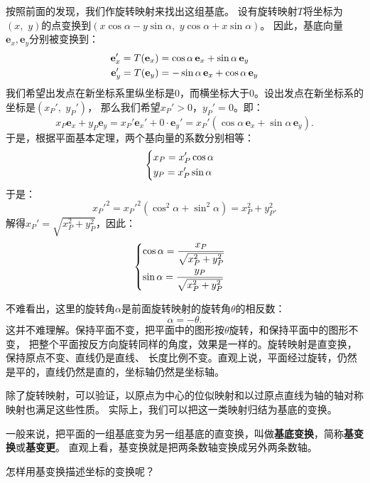 \documentclass[12pt,UTF8]{ctexbook}
\begin{document}
按照前面的发现，我们作旋转映射来找出这组基底。
设有旋转映射$T$将坐标为$(x,\,\, y)$的点变换到$(x\cos{\alpha} - y\sin{\alpha},\,\,y\cos{\alpha} + x\sin{\alpha})$。
因此，基底向量$\mathbf{e}_x, \mathbf{e}_y$分别被变换到：
\begin{align}
    \mathbf{e}_x' = T(\mathbf{e}_x) &= \cos{\alpha}\,\mathbf{e}_x + \sin{\alpha}\,\mathbf{e}_y \notag \\
    \mathbf{e}_y' = T(\mathbf{e}_y) &= -\sin{\alpha}\,\mathbf{e}_x + \cos{\alpha}\,\mathbf{e}_y \notag 
\end{align}
我们希望出发点在新坐标系里纵坐标是$0$，而横坐标大于$0$。设出发点在新坐标系的坐标是$(x_P', \,\, y_P')$，
那么我们希望$x_P' > 0$，$y_P' = 0$。即：
$$ x_P\mathbf{e}_x + y_P\mathbf{e}_y = x_P' \mathbf{e}_x' + 0 \cdot \mathbf{e}_y' = x_P' (\cos{\alpha}\,\mathbf{e}_x + \sin{\alpha}\,\mathbf{e}_y). $$
于是，根据平面基本定理，两个基向量的系数分别相等：
\begin{alignat*}{1}
&   \begin{dcases}
        x_P = x_P' \cos{\alpha} \\
        y_P = x_P' \sin{\alpha} 
    \end{dcases}
\end{alignat*}
于是：
$$ x_P'^2 = x_P'^2 (\cos^2{\alpha} + \sin^2{\alpha}) = x_P^2 + y_P^2. $$
解得$x_P' = \sqrt{x_P^2 + y_P^2}$，因此：
\begin{alignat*}{1}
&   \begin{dcases}
        \cos{\alpha} = \frac{x_P}{\sqrt{x_P^2 + y_P^2}} \\
        \sin{\alpha} = \frac{y_P}{\sqrt{x_P^2 + y_P^2}} 
    \end{dcases}
\end{alignat*}

不难看出，这里的旋转角$\alpha$是前面旋转映射的旋转角$\theta$的相反数：
$$ \alpha = -\theta.$$
这并不难理解。保持平面不变，把平面中的图形按$\theta$旋转，和保持平面中的图形不变，
把整个平面按反方向旋转同样的角度，效果是一样的。旋转映射是直变换，保持原点不变、直线仍是直线、
长度比例不变。直观上说，平面经过旋转，仍然是平的，直线仍然是直的，坐标轴仍然是坐标轴。

除了旋转映射，可以验证，以原点为中心的位似映射和以过原点直线为轴的轴对称映射也满足这些性质。
实际上，我们可以把这一类映射归结为基底的变换。

一般来说，把平面的一组基底变为另一组基底的直变换，叫做\textbf{基底变换}，简称\textbf{基变换}或\textbf{基变更}。
直观上看，基变换就是把两条数轴变换成另外两条数轴。

怎样用基变换描述坐标的变换呢？
\end{document}
